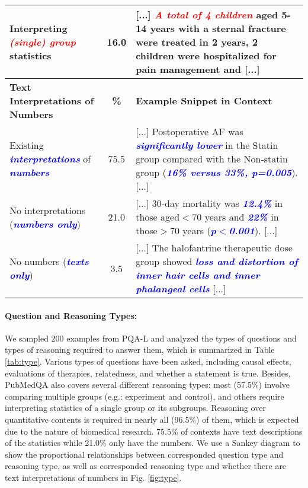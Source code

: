 \documentclass[11pt,a4paper]{article}
\begin{document}
\begin{table*}[!t]
\begin{tabular}{p{4.6cm}cp{9.5cm}}
        \midrule
        {Interpreting \textit{\textbf{\textcolor{red}{(single) group}}} statistics} & 16.0 & [...] \textit{\textbf{\textcolor{red}{A total of 4 children}}} aged 5-14 years with a sternal fracture were treated in 2 years, 2 children were hospitalized for pain management and [...]\\
        \toprule
        \textbf{Text Interpretations of Numbers} & \textbf{\%} & \textbf{Example Snippet in Context} \\ 
        \midrule
        Existing \textbf{\textit{\textcolor{blue}{interpretations}}} of \textbf{\textit{\textcolor{blue}{numbers}}} & 75.5 & [...] Postoperative AF was \textbf{\textit{\textcolor{blue}{significantly lower}}} in the Statin group compared with the Non-statin group (\textbf{\textit{\textcolor{blue}{16\% versus 33\%, p=0.005}}}). [...] \\
        \midrule
        No interpretations (\textbf{\textit{\textcolor{blue}{numbers only}}}) & 21.0 & [...] 30-day mortality was \textbf{\textit{\textcolor{blue}{12.4\%}}} in those aged$<$70 years and \textbf{\textit{\textcolor{blue}{22\%}}} in those$>$70 years (\textbf{\textit{\textcolor{blue}{p$<$0.001}}}). [...] \\
        \midrule
        No numbers (\textbf{\textit{\textcolor{blue}{texts only}}}) & 3.5 &  [...] The halofantrine therapeutic dose group showed \textbf{\textit{\textcolor{blue}{loss and distortion of inner hair cells and inner phalangeal cells}}} [...] \\
        \bottomrule
    \end{tabular}
    \vskip -0.15cm
    \caption{Summary of PubMedQA question types, reasoning types and whether there are text descriptions of the statistics in context. Colored texts are matched key phrases (sentences) between types and examples.
    }
    \label{tab:type}
    \vspace{-0.5em}
\end{table*}


\paragraph{Question and Reasoning Types:} We sampled 200 examples from PQA-L and analyzed the types of questions and types of reasoning required to answer them, which is summarized in Table \ref{tab:type}. Various types of questions have been asked, including causal effects, evaluations of therapies, relatedness, and whether a statement is true. Besides, PubMedQA also covers several different reasoning types: most (57.5\%) involve comparing multiple groups (e.g.: experiment and control), and others require interpreting statistics of a single group or its subgroups. Reasoning over quantitative contents is required in nearly all (96.5\%) of them, which is expected due to the nature of biomedical research. 75.5\% of contexts have text descriptions of the statistics while 21.0\% only have the numbers. We use a Sankey diagram to show the proportional relationships between corresponded question type and reasoning type, as well as corresponded reasoning type and whether there are text interpretations of numbers in Fig. \ref{fig:type}.
\end{document}
